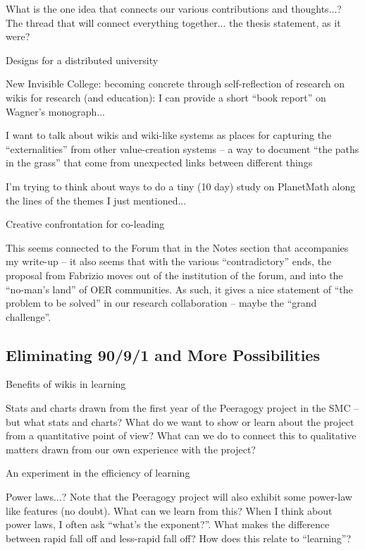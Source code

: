 \documentclass{acm_proc_article-sp}
\begin{document}
        What is the one idea that connects our various contributions and thoughts...? The thread that will connect everything together... the thesis statement, as it were?

    Designs for a distributed university

        New Invisible College: becoming concrete through self-reflection of research on wikis for research (and education): I can provide a short ``book report'' on Wagner's monograph...

        I want to talk about wikis and wiki-like systems as places for capturing the ``externalities'' from other value-creation systems -- a way to document ``the paths in the grass'' that come from unexpected links between different things

        I'm trying to think about ways to do a tiny (10 day) study on PlanetMath along the lines of the themes I just mentioned...

    Creative confrontation for co-leading

        This seems connected to the Forum that in the Notes section that accompanies my write-up -- it also seems that with the various ``contradictory'' ends, the proposal from Fabrizio moves out of the institution of the forum, and into the ``no-man's land'' of OER communities. As such, it gives a nice statement of ``the problem to be solved'' in our research collaboration -- maybe the ``grand challenge''.

\subsection{Eliminating 90/9/1 and More Possibilities}

    Benefits of wikis in learning

        Stats and charts drawn from the first year of the Peeragogy project in the SMC -- but what stats and charts? What do we want to show or learn about the project from a quantitative point of view? What can we do to connect this to qualitative matters drawn from our own experience with the project?

    An experiment in the efficiency of learning

        Power laws...? Note that the Peeragogy project will also exhibit some power-law like features (no doubt). What can we learn from this? When I think about power laws, I often ask ``what's the exponent?''. What makes the difference between rapid fall off and less-rapid fall off? How does this relate to ``learning''?
\end{document}
